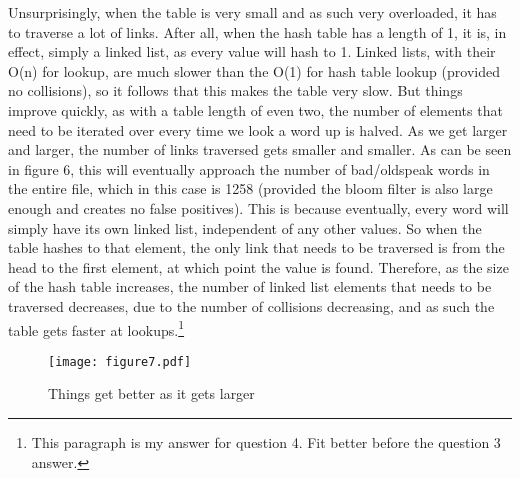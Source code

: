 \documentclass[11pt]{article}
\begin{document}
Unsurprisingly, when the table is very small and as such very overloaded, it has to traverse a lot of links. After all, when the hash table has a length of 1, it is, in effect, simply a linked list, as every value will hash to 1. Linked lists, with their O(n) for lookup, are much slower than the O(1) for hash table lookup (provided no collisions), so it follows that this makes the table very slow. But things improve quickly, as with a table length of even two, the number of elements that need to be iterated over every time we look a word up is halved. As we get larger and larger, the number of links traversed gets smaller and smaller. As can be seen in figure 6, this will eventually approach the number of bad/oldspeak words in the entire file, which in this case is 1258 (provided the bloom filter is also large enough and creates no false positives). This is because eventually, every word will simply have its own linked list, independent of any other values. So when the table hashes to that element, the only link that needs to be traversed is from the head to the first element, at which point the value is found. Therefore, as the size of the hash table increases, the number of linked list elements that needs to be traversed decreases, due to the number of collisions decreasing, and as such the table gets faster at lookups.\footnote{This paragraph is my answer for question 4. Fit better before the question 3 answer.}

\begin{figure}[tbp]
\begin{centering}
\texttt{[image: figure7.pdf]}
\caption{Things get better as it gets larger}
\end{centering}
\end{figure}
\end{document}
